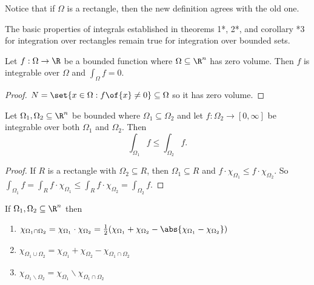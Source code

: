 Notice that if $\Omega$ is a rectangle, then the new definition agrees with the old one.

\begin{theorem}
    The basic properties of integrals established in theorems 1*, 2*, and corollary *3 for integration over rectangles remain true for integration over bounded sets.
\end{theorem}

\begin{corollary}
    Let $f: \Omega \to \R$ be a bounded function where $\Omega \subseteq \R^n$ has zero volume. Then $f$ is integrable over $\Omega$ and $\int_\Omega f = 0$.
\end{corollary}
\begin{proof}
    $N = \set{x \in \Omega: f\of{x} \neq 0} \subseteq \Omega$ so it has zero volume.
\end{proof}

\begin{theorem}
    Let $\Omega_1, \Omega_2 \subseteq \R^n$ be bounded where $\Omega_1 \subseteq \Omega_2$ and let $f: \Omega_2 \to [0, \infty]$ be integrable over both $\Omega_1$ and $\Omega_2$. Then \[\int_{\Omega_1} f \leq \int_{\Omega_2} f.\]
\end{theorem}
\begin{proof}
    If $R$ is a rectangle with $\Omega_2 \subseteq R$, then $\Omega_1 \subseteq R$ and $f \cdot \chi_{\Omega_1} \leq f \cdot \chi_{\Omega_2}$. So $\int_{\Omega_1} f = \int_R f \cdot \chi_{\Omega_1} \leq \int_R f \cdot \chi_{\Omega_2} = \int_{\Omega_2} f$.
\end{proof}

\begin{lemma}
    If $\Omega_1, \Omega_2 \subseteq \R^n$ then 
    \begin{enumerate}
        \item $\chi_{\Omega_1 \cap \Omega_2} = \chi_{\Omega_1} \cdot \chi_{\Omega_2} = \frac{1}{2} (\chi_{\Omega_1} + \chi_{\Omega_2} - \abs{\chi_{\Omega_1} - \chi_{\Omega_2}})$
        \item $\chi_{\Omega_1 \cup \Omega_2} = \chi_{\Omega_1} + \chi_{\Omega_2} - \chi_{\Omega_1 \cap \Omega_2}$
        \item $\chi_{\Omega_1 \backslash \Omega_2} = \chi_{\Omega_1} \backslash \chi_{\Omega_1 \cap \Omega_2}$
    \end{enumerate}
\end{lemma}

